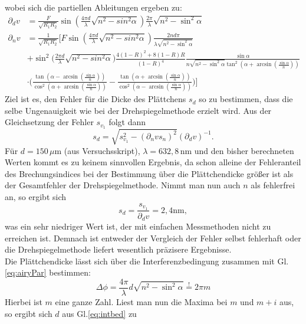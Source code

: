 wobei sich die partiellen Ableitungen ergeben zu:
\begin{align*}
    \partial_dv &= \frac{F}{\sqrt{R_1R_2}}\sin(\frac{4\pi d}{\lambda}\sqrt{n^2-sin^2\alpha})\frac{2\pi}{\lambda}\sqrt{n^2-\sin^2\alpha}\\
    \partial_nv &= \frac{1}{\sqrt{R_1R_2}} \Bigg[ F \sin(\frac{4\pi d}{\lambda}\sqrt{n^2-sin^2\alpha})\frac{2nd\pi}{\lambda \sqrt{n^2-\sin^2\alpha}}\\
    &+ \sin^2\biggl(\frac{2\pi d}{\lambda}\sqrt{n^2-sin^2\alpha} \biggl ) \frac{4(1-R)^2+8(1-R)R}{(1-R)^4} \frac{\sin\alpha}{n\sqrt{n^2-\sin^2\alpha}\tan^2(\alpha+ \arcsin(\frac{\sin\alpha}{n}))}\\
    &\cdot \biggl (\frac{\tan(\alpha - \arcsin(\frac{\sin\alpha}{n}))}{\cos^2(\alpha + \arcsin(\frac{\sin\alpha}{n}))} - \frac{\tan(\alpha+ \arcsin(\frac{\sin\alpha}{n}))}{\cos^2(\alpha - \arcsin(\frac{\sin\alpha}{n}))} \biggl ) \Bigg]
\end{align*}
Ziel ist es, den Fehler für die Dicke des Plättchens $s_d$ so zu bestimmen, dass die selbe Ungenauigkeit wie bei der Drehspiegelmethode erzielt wird. Aus der Gleichsetzung der 
Fehler $s_{v_1}$ folgt dann 
\begin{equation*}
    s_d = \sqrt{s_{v_1}^2 - (\partial_nvs_n)^2}(\partial_dv)^{-1}.
\end{equation*}
Für $d = 150\,\mu$m (aus Versuchsskript), $\lambda = 632,8\,$nm und den bisher berechneten Werten 
kommt es zu keinem sinnvollen Ergebnis, da schon alleine der Fehleranteil des Brechungsindices bei der Bestimmung über die Plättchendicke größer ist als der 
Gesamtfehler der Drehspiegelmethode. Nimmt man nun auch $n$ als fehlerfrei an, so ergibt sich 
\begin{equation*}
    s_d = \frac{s_{v_1}}{\partial_dv} = 2,4 \mathrm{nm},
\end{equation*}
was ein sehr niedriger Wert ist, der mit einfachen Messmethoden nicht zu erreichen ist. Demnach ist entweder der Vergleich der Fehler selbst fehlerhaft oder die Drehspiegelmethode 
liefert wesentlich präzisere Ergebnisse.\\
Die Plättchendicke lässt sich über die Interferenzbedingung zusammen mit Gl.\ref{eq:airyPar} bestimmen:
\begin{equation}
    \Delta \phi = \frac{4\pi}{\lambda}d\sqrt{n^2-\sin^2\alpha} \overset{!}{=} 2\pi m 
    \label{eq:intbed}
\end{equation}
Hierbei ist $m$ eine ganze Zahl. Liest man nun die Maxima bei $m$ und $m+i$ aus, so ergibt sich $d$ aus Gl.\ref{eq:intbed} zu 
